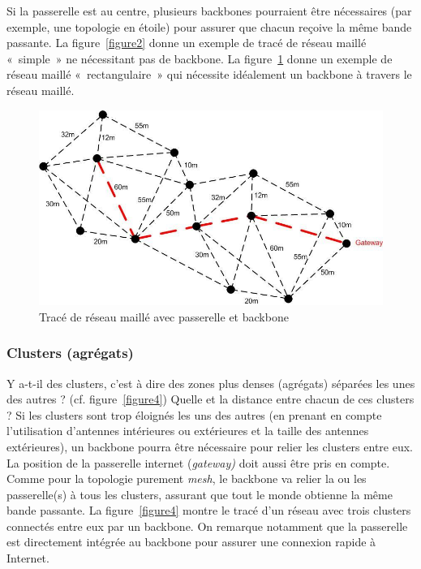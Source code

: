 \documentclass[a4paper,french,11pt,twoside]{article}
\begin{document}
Si la passerelle est au centre, plusieurs backbones pourraient être nécessaires (par exemple, une topologie en étoile) pour assurer que chacun reçoive la même bande passante. La figure~\ref{figure2} donne un exemple de tracé de réseau maillé «~simple~» ne nécessitant pas de backbone. La figure~\ref{figure3} donne un exemple de réseau maillé «~rectangulaire~» qui  nécessite idéalement un backbone à travers le réseau maillé.

\begin{figure}[!h]
\center
\includegraphics[scale=0.42]{figure3.jpeg}
\caption{Tracé de réseau maillé avec passerelle et backbone} %
\label{figure3}
\end{figure}

\subsubsection{Clusters (agrégats)}

Y a-t-il des clusters, c'est à dire des zones plus denses (agrégats) séparées les unes des autres ? (cf. figure~\ref{figure4}) Quelle et la distance entre chacun de ces clusters ? Si les clusters sont trop éloignés les uns des autres (en prenant en compte l'utilisation d'antennes intérieures ou extérieures et la taille des antennes extérieures), un backbone pourra être nécessaire pour relier les clusters entre eux. La position de la passerelle internet (\textit{gateway)} doit aussi être pris en compte. Comme pour la topologie purement \textit{mesh}, le backbone va relier la ou les passerelle(s) à tous les clusters, assurant que tout le monde obtienne la même bande passante. La figure~\ref{figure4} montre le tracé d'un réseau avec trois clusters connectés entre eux par un backbone. On remarque notamment que la passerelle est directement intégrée au backbone pour assurer une connexion rapide à Internet.
\end{document}

